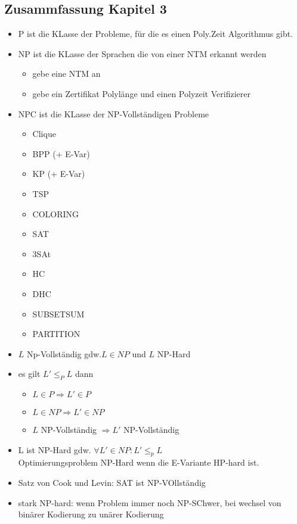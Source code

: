 \documentclass[a4paper, 10pt]{article}
\theoremstyle{definition}
\begin{document}
\subsection{Zusammfassung Kapitel 3}
\begin{itemize}
    \item P ist die KLasse der Probleme, für die es einen Poly.Zeit Algorithmus gibt.
    \item NP ist die KLasse der Sprachen die von einer NTM erkannt werden \begin{itemize}
        \item gebe eine NTM an
        \item gebe ein Zertifikat Polylänge und einen Polyzeit Verifizierer
    \end{itemize}
    \item NPC ist die KLasse der NP-Vollständigen Probleme\begin{itemize}
        \item Clique
        \item BPP (+ E-Var)
        \item KP (+ E-Var)
        \item TSP
        \item COLORING
        \item SAT
        \item 3SAt
        \item HC
        \item DHC
        \item SUBSETSUM
        \item PARTITION
    \end{itemize}
    \item $L$ Np-Vollständig gdw.$L\in NP$ und $L$ NP-Hard
    \item es gilt $L'\leq_P L$ dann \begin{itemize}
        \item $L\in P\Rightarrow L'\in P$
        \item $L\in NP\Rightarrow L'\in NP$
        \item $L$ NP-Vollständig $\Rightarrow L'$ NP-Vollständig
    \end{itemize}
    \item L ist NP-Hard gdw. $\forall L'\in NP: L'\leq_p L$\\ Optimierungsproblem NP-Hard wenn die E-Variante HP-hard ist.
    \item Satz von Cook und Levin: SAT ist NP-VOllständig
    \item stark NP-hard: wenn Problem immer noch NP-SChwer, bei wechsel von binärer Kodierung zu unärer Kodierung

\end{itemize}
\end{document}
